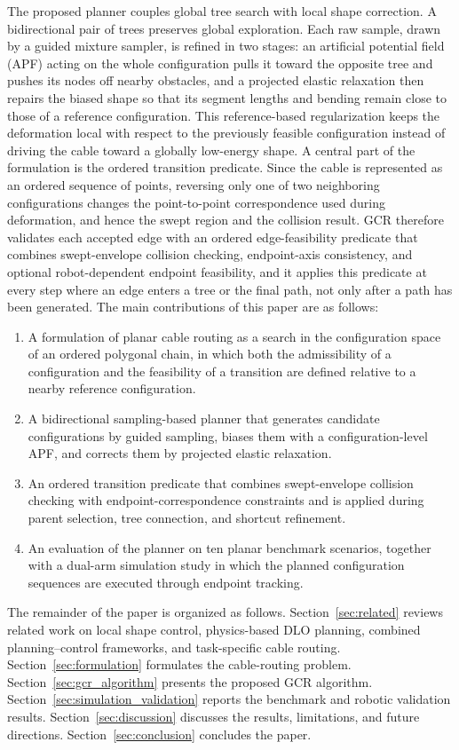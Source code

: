 \documentclass{pas}
\begin{document}
The proposed planner couples global tree search with local shape correction. A bidirectional pair of trees preserves global exploration. Each raw sample, drawn by a guided mixture sampler, is refined in two stages: an artificial potential field (APF) acting on the whole configuration pulls it toward the opposite tree and pushes its nodes off nearby obstacles, and a projected elastic relaxation then repairs the biased shape so that its segment lengths and bending remain close to those of a reference configuration. This reference-based regularization keeps the deformation local with respect to the previously feasible configuration instead of driving the cable toward a globally low-energy shape. A central part of the formulation is the ordered transition predicate. Since the cable is represented as an ordered sequence of points, reversing only one of two neighboring configurations changes the point-to-point correspondence used during deformation, and hence the swept region and the collision result. GCR therefore validates each accepted edge with an ordered edge-feasibility predicate that combines swept-envelope collision checking, endpoint-axis consistency, and optional robot-dependent endpoint feasibility, and it applies this predicate at every step where an edge enters a tree or the final path, not only after a path has been generated. The main contributions of this paper are as follows:
\begin{enumerate}
    \item A formulation of planar cable routing as a search in the configuration space of an ordered polygonal chain, in which both the admissibility of a configuration and the feasibility of a transition are defined relative to a nearby reference configuration.
    \item A bidirectional sampling-based planner that generates candidate configurations by guided sampling, biases them with a configuration-level APF, and corrects them by projected elastic relaxation.
    \item An ordered transition predicate that combines swept-envelope collision checking with endpoint-correspondence constraints and is applied during parent selection, tree connection, and shortcut refinement.
    \item An evaluation of the planner on ten planar benchmark scenarios, together with a dual-arm simulation study in which the planned configuration sequences are executed through endpoint tracking.
\end{enumerate}
The remainder of the paper is organized as follows. Section~\ref{sec:related} reviews related work on local shape control, physics-based DLO planning, combined planning--control frameworks, and task-specific cable routing. Section~\ref{sec:formulation} formulates the cable-routing problem. Section~\ref{sec:gcr_algorithm} presents the proposed GCR algorithm. Section~\ref{sec:simulation_validation} reports the benchmark and robotic validation results. Section~\ref{sec:discussion} discusses the results, limitations, and future directions. Section~\ref{sec:conclusion} concludes the paper.
\end{document}
